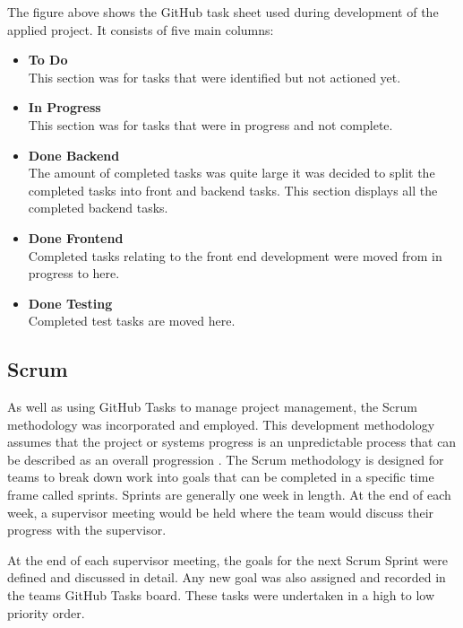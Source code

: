 The figure above shows the GitHub task sheet used during development of the applied project. It consists of five main columns:

\begin{itemize}
\item \textbf{To Do}\\
This section was for tasks that were identified but not actioned yet.
\item \textbf{In Progress}\\
This section was for tasks that were in progress and not complete.
\item \textbf{Done Backend}\\
The amount of completed tasks was quite large it was decided to split the completed tasks into front and backend tasks. This section displays all the completed backend tasks.
\item \textbf{Done Frontend}\\
Completed tasks relating to the front end development were moved from in progress to here.
\item \textbf{Done Testing}\\
Completed test tasks are moved here.
\end{itemize}

\vspace{50mm} %

\subsection{Scrum}
As well as using GitHub Tasks to manage project management, the Scrum methodology was incorporated and employed. This development methodology assumes that the project or systems progress is an unpredictable process that can be described as an overall progression \cite{schwaber1997scrum}. The Scrum methodology is designed for teams to break down work into goals that can be completed in a specific time frame called sprints. Sprints are generally one week in length. At the end of each week, a supervisor meeting would be held where the team would discuss their progress with the supervisor.

\vspace{5mm} %

At the end of each supervisor meeting, the goals for the next Scrum Sprint were defined and discussed in detail. Any new goal was also assigned and recorded in the teams GitHub Tasks board. These tasks were undertaken in a high to low priority order.

